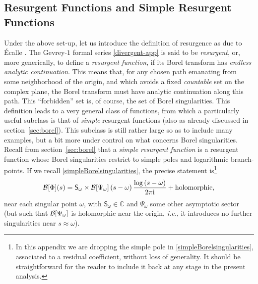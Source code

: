 \documentclass[11pt,a4paper]{article}
\newcommand{\CB}{{\cal B}}
\def\BC{{\mathbb C}}
\newcommand{\be}{\begin{equation}}
\newcommand{\ee}{\end{equation}}
\newcommand{\rmi}{{\mathrm{i}}}
\begin{document}
\subsection*{Resurgent Functions and Simple Resurgent Functions}

Under the above set-up, let us introduce the definition of resurgence as due to \'Ecalle \cite{e81}. The Gevrey-$1$ formal series \eqref{divergent-app} is said to be \textit{resurgent}, or, more generically, to define a \textit{resurgent function}, if its Borel transform has \textit{endless analytic continuation}. This means that, for any chosen path emanating from some neighborhood of the origin, and which avoids a fixed \textit{countable} set on the complex plane, the Borel transform must have analytic continuation along this path. This ``forbidden'' set is, of course, the set of Borel singularities. This definition leads to a very general class of functions, from which a particularly useful subclass is that of \textit{simple} resurgent functions (also as already discussed in section~\ref{sec:borel}). This subclass is still rather large so as to include many examples, but a bit more under control on what concerns Borel singularities. Recall from section~\ref{sec:borel} that a \textit{simple resurgent function} is a resurgent function whose Borel singularities restrict to simple poles and logarithmic branch-points. If we recall \eqref{simpleBorelsingularities}, the precise statement is\footnote{In this appendix we are dropping the simple pole in \eqref{simpleBorelsingularities}, associated to a residual coefficient, without loss of generality. It should be straightforward for the reader to include it back at any stage in the present analysis.}
%
\be
\label{simple-app}
\CB [\Phi] (s) = \mathsf{S}_\omega \times \CB [\Psi_\omega] \left( s-\omega \right) \frac{\log \left( s-\omega \right)}{2\pi\rmi} + \text{holomorphic},
\ee
%
\noindent
near each singular point $\omega$, with $\mathsf{S}_\omega \in \BC$ and $\Psi_\omega$ some other asymptotic sector (but such that $\CB [\Psi_\omega]$ is holomorphic near the origin, \textit{i.e.}, it introduces no further singularities near $s \approx \omega$).
\end{document}

